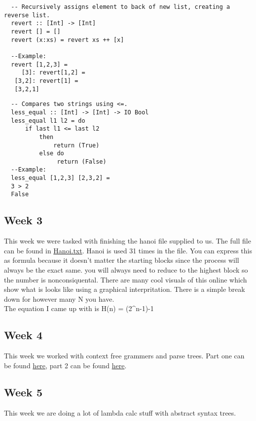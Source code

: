 \documentclass{article}
\theoremstyle{theorem}
\theoremstyle{definition}
\theoremstyle{remark}
\begin{document}
\begin{lstlisting}
  -- Recursively assigns element to back of new list, creating a reverse list.
  revert :: [Int] -> [Int]
  revert [] = []
  revert (x:xs) = revert xs ++ [x]

  --Example:
  revert [1,2,3] = 
     [3]: revert[1,2] =
   [3,2]: revert[1] =
   [3,2,1]
\end{lstlisting}
\begin{lstlisting}
  -- Compares two strings using <=.
  less_equal :: [Int] -> [Int] -> IO Bool
  less_equal l1 l2 = do
      if last l1 <= last l2
          then 
              return (True)
          else do
               return (False)
  --Example:
  less_equal [1,2,3] [2,3,2] = 
  3 > 2
  False
\end{lstlisting}

\subsection{Week 3}

This week we were tasked with finishing the hanoi file supplied to us. The full file can be found 
in \href {https://github.com/jacgoldberg/Programming-Lang/blob/main/Hanoi.txt}{Hanoi.txt}.
Hanoi is used 31 times in the file. 
You can express this as formula because it doesn't matter the starting blocks since the process will always be the exact same.
you will always need to reduce to the highest block so the number is nonconsiquental. There are many cool visuals of this online which show what is looks like using a graphical interpritation. There is a simple break down for however many N you have. 
\\ The equation I came up with is H(n) = (2^n-1)-1

\subsection{Week 4}
This week we worked with context free grammers and parse trees. Part one can be found \href{https://github.com/jacgoldberg/Programming-Lang/blob/main/Note%20Sep%2025%2C%202022%20(1).pdf}{here}, part 2 can be found 
\href{https://github.com/jacgoldberg/Programming-Lang/blob/main/Note%20Dec%2019%2C%202022.pdf} {here}. 

\subsection{Week 5}
This week we are doing a lot of lambda calc stuff with abstract syntax trees.
\end{document}
